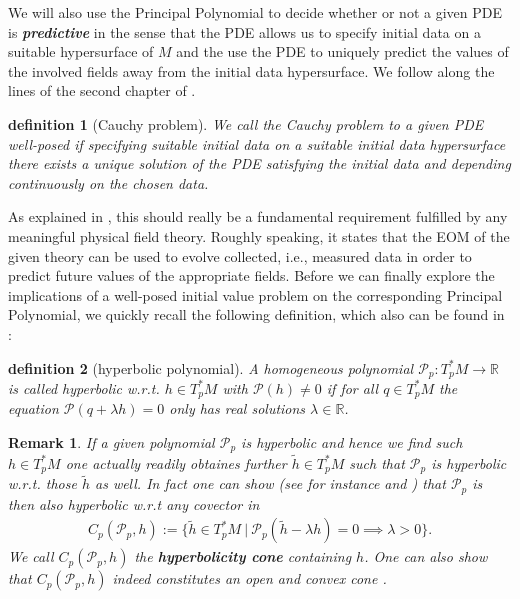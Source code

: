\documentclass[a4paper,12pt, DIV=14, BCOR=5mm, twoside, headsepline, numbers=noenddot]{scrbook}
\newtheorem{definition}{definition}[section]
\newtheorem*{remark}{Remark}
\begin{document}
We will also use the Principal Polynomial to decide whether or not a given PDE is \textit{\textbf{predictive}} in the sense that the PDE allows us to specify initial data on a suitable hypersurface of $M$ and the use the PDE to uniquely predict the values of the involved fields away from the initial data hypersurface. We follow along the lines of the second chapter of \cite{Rivera}.
\begin{definition}[Cauchy problem]
We call the Cauchy problem to a given PDE well-posed if specifying suitable initial data on a suitable initial data hypersurface there exists a unique solution of the PDE satisfying the initial data and depending continuously on the chosen data.  
\end{definition}
As explained in \cite{Rivera}, this should really be a fundamental requirement fulfilled by any meaningful physical field theory. Roughly speaking, it states that the EOM of the given theory can be used to evolve collected, i.e., measured data in order to predict future values of the appropriate fields.
Before we can finally explore the implications of a well-posed initial value problem on the corresponding Principal Polynomial, we quickly recall the following definition, which also can be found in \cite{Rivera}:
\begin{definition}[hyperbolic polynomial]
A homogeneous polynomial $\mathcal{P}_p : T_p^{\ast}M \rightarrow \mathbb{R}$ is called hyperbolic w.r.t. $h\in T_p^{\ast}M$ with $\mathcal{P}(h) \neq 0$ if for all $q\in T_p^{\ast}M$ the equation $\mathcal{P}(q + \lambda h)=0$ only has real solutions $\lambda \in \mathbb{R}$.
\end{definition}
\begin{remark}
If a given polynomial $\mathcal{P}_p$ is hyperbolic and hence we find such $h\in T^{\ast}_pM$ one actually readily obtaines further $\tilde{h}\in T^{\ast}_pM$ such that $\mathcal{P}_p$ is hyperbolic w.r.t. those $\tilde{h}$ as well. In fact one can show (see for instance \cite{Rivera} and \cite{10.2307/24900665}) that $\mathcal{P}_p$ is then also hyperbolic w.r.t any covector in 
\begin{align}
    C_p(\mathcal{P}_p,h) := \{ \tilde{h} \in T_p^{\ast}M \ \vert \ \mathcal{P}_p(\tilde{h}- \lambda h) = 0 \implies \lambda > 0\}.
\end{align}
We call $C_p(\mathcal{P}_p,h)$ the \textbf{\textit{hyperbolicity cone}} containing $h$. One can also show that $C_p(\mathcal{P}_p,h)$ indeed constitutes an open and convex cone \cite{10.2307/24900665}.
\end{remark}
\end{document}
